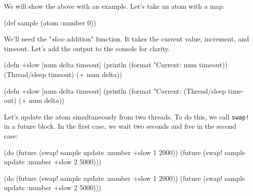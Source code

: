 We will show the above with an example.
Let's take an atom with a map:

\begin{english}
  \begin{clojure}
(def sample (atom {:number 0}))
  \end{clojure}
\end{english}

We'll need the "\emph{slow} addition" function.
It takes the current value, increment, and timeout.
Let's add the output to the console for clarity.

\ifx\DEVICETYPE\MOBILE

\begin{english}
  \begin{clojure}
(defn +slow
  [num delta timeout]
  (println
    (format "Current: %
      num timeout))
  (Thread/sleep timeout)
  (+ num delta))
  \end{clojure}
\end{english}

\else

\begin{english}
  \begin{clojure}
(defn +slow
  [num delta timeout]
  (println (format "Current: %
  (Thread/sleep timeout)
  (+ num delta))
  \end{clojure}
\end{english}

\fi


Let's update the atom simultaneously from two threads. To do this, we call \verb|swap!| in a future block. In the first case, we wait two seconds and five in the second case:

\ifx\DEVICETYPE\MOBILE

\begin{english}
  \begin{clojure}
(do (future (swap! sample update
              :number +slow 1 2000))
    (future (swap! sample update
              :number +slow 2 5000)))
  \end{clojure}
\end{english}

\else

\begin{english}
  \begin{clojure}
(do (future (swap! sample update :number +slow 1 2000))
    (future (swap! sample update :number +slow 2 5000)))
  \end{clojure}
\end{english}

